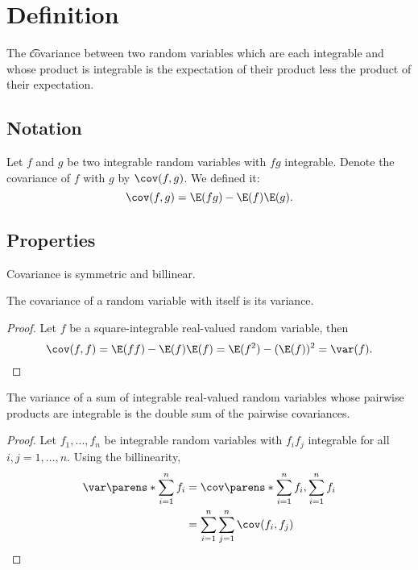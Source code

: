 
\section*{Definition}

The \t{covariance} between two random variables which are each integrable and whose product is integrable is the expectation of their product less the product of their expectation.

\subsection*{Notation}

Let $f$ and $g$ be two integrable random variables with $fg$ integrable.
Denote the covariance of $f$ with $g$ by $\cov(f, g)$.
We defined it:
  \[
\cov(f, g) = \E (fg) - \E (f)\E (g).
  \]

\subsection*{Properties}

\begin{proposition}Covariance is symmetric and billinear.\end{proposition}
\begin{proposition}The covariance of a random variable with itself is its variance.\end{proposition}
\begin{proof}Let $f$ be a square-integrable real-valued random variable, then
\[
\cov(f, f) = \E (ff) - \E (f)\E (f) = \E (f^2) - (\E (f))^2 = \var(f).
\]\end{proof}
\begin{proposition}The variance of a sum of integrable real-valued random variables whose pairwise products are integrable is the double sum of the pairwise covariances.\end{proposition}
\begin{proof}Let $f_1, \dots , f_n$ be integrable random variables with $f_if_j$ integrable for all $i,j = 1, \dots , n$.
Using the billinearity,
\[
\begin{aligned}
\var\parens*{\sum_{i = 1}^{n} f_i}
&= \cov\parens*{\sum_{i = 1}^{n} f_i, \sum_{i = 1}^{n}f_i} \\
&= \sum_{i = 1}^{n} \sum_{j = 1}^{n} \cov(f_i, f_j)
\end{aligned}
\]\end{proof}
\blankpage